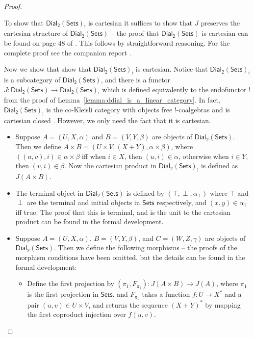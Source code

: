 \documentclass{elsarticle}
\newcommand{\dial}[0]{\mathsf{Dial_2}(\mathsf{Sets})}
\newcommand{\sets}[0]{\mathsf{Sets}}
\begin{document}
\begin{proof}
\begin{paper}
    To show that $\dial_!$ is cartesian it suffices to show that $J$
    preserves the cartesian structure of $\dial$ -- the proof that
    $\dial$ is cartesian can be found on page 48 of
    \cite{dePaiva:1988}.  This follows by straightforward reasoning.
    For the complete proof see the companion report \cite{Eades:2015}.
  \end{paper}
  \begin{report}
  Now we show that show that $\dial_!$ is cartesian.  Notice that
  $\dial_!$ is a subcategory of $\dial$, and there is a functor $J :
  \dial \to \dial_!$ which is defined equivalently to the endofunctor
  $!$ from the proof of Lemma~\ref{lemma:ddial_is_a_linear_category}.
  In fact, $\dial_!$ is the co-Kleisli category with objects free
  !-coalgebras and is cartesian closed \cite{dePaiva:1987}.  However,
  we only need the fact that it is cartesian.
  \begin{itemize}
  \item Suppose $A = (U , X , \alpha)$ and $B = (V , Y , \beta)$ are
    objects of $\dial$. Then we define $A \times B = (U \times V, (X +
    Y), \alpha \times \beta)$, where $((u , v), i) \in \alpha \times
    \beta$ iff when $i \in X$, then $(u , i) \in \alpha$, otherwise
    when $i \in Y$, then $(v , i) \in \beta$.  Now the cartesian
    product in $\dial_!$ is defined as $J(A \times B)$.

  \item The terminal object in $\dial$ is defined by $(\top, \perp,
    \alpha_\top)$ where $\top$ and $\perp$ are the terminal and
    initial objects in $\sets$ respectively, and $(x , y) \in
    \alpha_\top$ iff true. The proof that this is terminal, and is the
    unit to the cartesian product can be found in the formal
    development.
    
  \item Suppose $A = (U , X , \alpha)$, $B = (V , Y , \beta)$, and $C
    = (W , Z , \gamma)$ are objects of $\dial$.  Then we define
    the following morphisms -- the proofs of the morphism conditions
    have been omitted, but the details can be found in the formal
    development:
    \begin{itemize}
    \item Define the first projection by $(\pi_1, F_{\pi_1}) : J(A
      \times B) \to J(A)$, where $\pi_1$ is the first projection in
      $\sets$, and $F_{\pi_1}$ takes a function $f : U \to X^*$ and a
      pair $(u , v) \in U \times V$, and returns the sequence $(X +
      Y)^*$ by mapping the first coproduct injection over $f(u ,v)$.


\end{itemize}
\end{itemize}
\end{report}
\end{proof}
\end{document}
